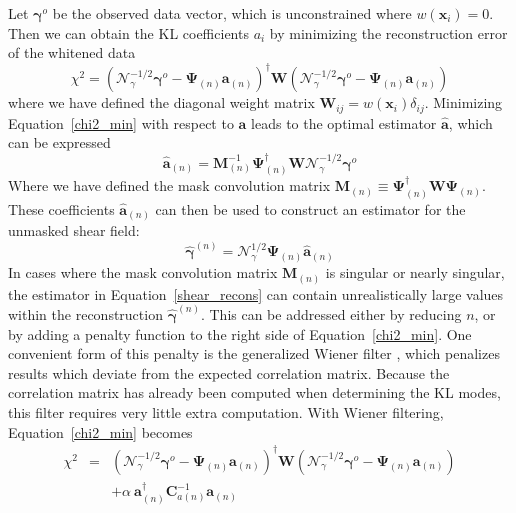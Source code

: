\documentclass[twocolumn]{emulateapj}
\newcommand{\myvec}[1]{\boldsymbol{#1}}
\newcommand{\mymat}[1]{\boldsymbol{#1}}
\newcommand{\Noise}{\mymat{\mathcal{N}}}
\begin{document}
Let $\myvec{\gamma}^o$ be the observed data vector, 
which is unconstrained where
$w(\myvec{x}_i)=0$.  Then we can obtain the KL coefficients $a_i$ by 
minimizing the reconstruction error of the whitened data
\begin{equation}
  \label{chi2_min}
  \chi^2 = ( \Noise_\gamma^{-1/2}\myvec{\gamma}^o
  - \myvec{\Psi}_{(n)}\myvec{a}_{(n)} )^\dagger 
  \myvec{W}
  ( \Noise_\gamma^{-1/2}\myvec{\gamma}^o
  - \myvec{\Psi}_{(n)}\myvec{a}_{(n)} )
\end{equation}
where we have defined the diagonal weight matrix 
$\myvec{W}_{ij} = w(\myvec{x}_i) \delta_{ij}$.
Minimizing Equation~\ref{chi2_min} with respect to $\myvec{a}$ leads to
the optimal estimator $\myvec{\hat{a}}$, which can be expressed
\begin{equation}
 \myvec{\hat{a}}_{(n)} = 
 \mymat{M}_{(n)}^{-1} 
 \myvec{\Psi}_{(n)}^\dagger \myvec{W} \Noise_\gamma^{-1/2}\myvec{\gamma}^o
\end{equation}
Where we have defined the mask convolution matrix 
$\mymat{M}_{(n)} \equiv \mymat{\Psi}_{(n)}^\dagger\mymat{W}\mymat{\Psi}_{(n)}$.
These coefficients $\myvec{\hat{a}}_{(n)}$
can then be used to construct an estimator for the unmasked shear field:
\begin{equation}
  \label{shear_recons}
  \myvec{\hat{\gamma}}^{(n)} = \Noise_\gamma^{1/2}\myvec{\Psi}_{(n)}\myvec{\hat{a}}_{(n)}
\end{equation}
In cases where the mask convolution matrix $\mymat{M}_{(n)}$  
is singular or nearly singular, the estimator in Equation~\ref{shear_recons}
can contain unrealistically large values within the reconstruction 
$\myvec{\hat{\gamma}}^{(n)}$.
This can be addressed either by reducing $n$, or by 
adding a penalty function to the right side of Equation~\ref{chi2_min}.  
One convenient form of this penalty is the generalized
Wiener filter \citep[see][]{Tegmark97}, which penalizes results which 
deviate from the expected correlation matrix.  Because the correlation
matrix has already been computed when determining the KL modes, 
this filter requires very little extra computation.
With Wiener filtering, Equation~\ref{chi2_min} becomes
\begin{eqnarray}
  \label{chi2_min_WF}
  \chi^2 & = & ( \Noise_\gamma^{-1/2}\myvec{\gamma}^o - \myvec{\Psi}_{(n)}\myvec{a}_{(n)} )^\dagger 
  \myvec{W} 
  (\Noise_\gamma^{-1/2}\myvec{\gamma}^o - \myvec{\Psi}_{(n)}\myvec{a}_{(n)} )
  \nonumber\\
  && + \alpha\ \myvec{a}_{(n)}^\dagger\myvec{C}_{a(n)}^{-1}\myvec{a}_{(n)}
\end{eqnarray}
\end{document}
